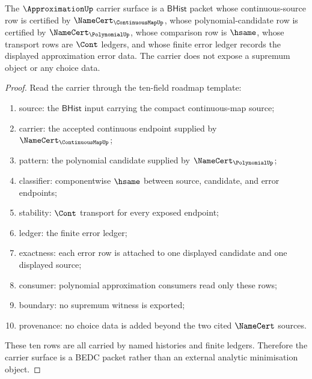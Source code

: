 \begin{theorem}
\label{thm:approximation-carrier-obligation-surface}
The $\ApproximationUp$ carrier surface is a $\mathsf{BHist}$ packet whose
continuous-source row is certified by $\NameCert_{\ContinuousMapUp}$, whose
polynomial-candidate row is certified by $\NameCert_{\PolynomialUp}$, whose
comparison row is $\hsame$, whose transport rows are $\Cont$ ledgers, and whose
finite error ledger records the displayed approximation error data. The carrier
does not expose a supremum object or any choice data.
\end{theorem}
\begin{proof}
Read the carrier through the ten-field roadmap template:
\begin{enumerate}
\item source: the $\mathsf{BHist}$ input carrying the compact continuous-map
source;
\item carrier: the accepted continuous endpoint supplied by
$\NameCert_{\ContinuousMapUp}$;
\item pattern: the polynomial candidate supplied by
$\NameCert_{\PolynomialUp}$;
\item classifier: componentwise $\hsame$ between source, candidate, and error
endpoints;
\item stability: $\Cont$ transport for every exposed endpoint;
\item ledger: the finite error ledger;
\item exactness: each error row is attached to one displayed candidate and one
displayed source;
\item consumer: polynomial approximation consumers read only these rows;
\item boundary: no supremum witness is exported;
\item provenance: no choice data is added beyond the two cited $\NameCert$
sources.
\end{enumerate}

These ten rows are all carried by named histories and finite ledgers. Therefore
the carrier surface is a BEDC packet rather than an external analytic
minimisation object.
\end{proof}

